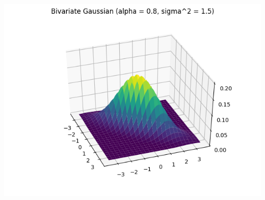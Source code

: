 \documentclass{article}
\begin{document}
\includegraphics[width=\linewidth]{Bivariate Gaussian (alpha = 0.8, sigma^2 = 1.5).png}
\end{document}
